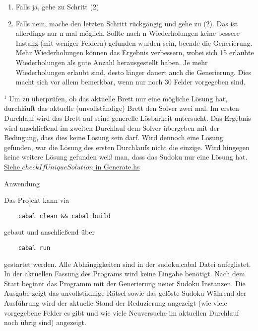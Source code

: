 \begin{enumerate}[(1)]
\begin{enumerate}[(1)]
\begin{enumerate}
                \item Falls ja, gehe zu Schritt (2)
                \item Falls nein, mache den letzten Schritt rückgängig und gehe zu (2). \newline
                Das ist allerdings nur n mal möglich. Sollte nach n Wiederholungen keine bessere Instanz (mit weniger Feldern) gefunden wurden sein, beende die Generierung. Mehr Wiederholungen können das Ergebnis verbessern, wobei sich 15 erlaubte Wiederholungen als gute Anzahl herausgestellt haben. Je mehr Wiederholungen erlaubt sind, desto länger dauert auch die Generierung. Dies macht sich vor allem bemerkbar, wenn nur noch 30 Felder vorgegeben sind.
            \end{enumerate}
        \end{enumerate}
\end{enumerate}
$^1$ Um zu überprüfen, ob das aktuelle Brett nur eine mögliche Lösung hat, durchläuft das aktuelle (unvollständige) Brett den Solver zwei mal. Im ersten Durchlauf wird das Brett auf seine generelle Lösbarkeit untersucht. Das Ergebnis wird anschließend im zweiten Durchlauf dem Solver übergeben mit der Bedingung, dass dies keine Lösung sein darf. Wird dennoch eine Lösung gefunden, war die Lösung des ersten Durchlaufs nicht die einzige. Wird hingegen keine weitere Lösung gefunden weiß man, dass das Sudoku nur eine Lösung hat. \newline
\underline{Siehe \(checkIfUniqueSolution\) in Generate.hs}

\vspace{2ex}

\begin{Large}
    Anwendung
\end{Large}
\vspace{2ex}

Das Projekt kann via
    \begin{lstlisting}
    cabal clean && cabal build
    \end{lstlisting}
gebaut und anschließend über
    \begin{lstlisting}
    cabal run
    \end{lstlisting}
gestartet werden. \newline
Alle Abhängigkeiten sind in der sudoku.cabal Datei aufeglistet.
In der aktuellen Fassung des Programs wird keine Eingabe benötigt. Nach dem Start beginnt das Programm mit der Generierung neuer Sudoku Instanzen. Die Ausgabe zeigt das unvollstädnige Rätsel sowie das gelöste Sudoku \newline
Während der Ausführung wird der aktuelle Stand der Reduzierung angezeigt (wie viele vorgegebene Felder es gibt und wie viele Neuversuche im aktuellen Durchlauf noch übrig sind) angezeigt.
\vspace{2ex}

